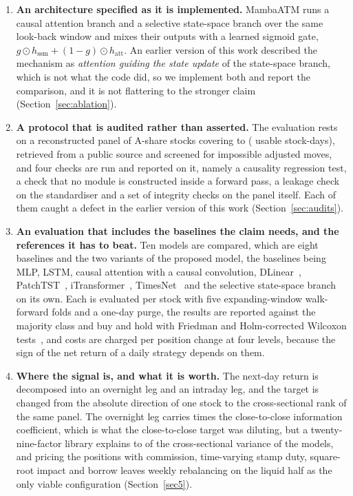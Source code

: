 \documentclass[pdflatex,sn-mathphys-ay]{sn-jnl}
\theoremstyle{thmstyleone}%
\theoremstyle{thmstyletwo}%
\theoremstyle{thmstyletwo}%
\begin{document}
\begin{enumerate}
	\item \textbf{An architecture specified as it is implemented.} MambaATM runs a causal attention
	branch and a selective state-space branch over the same look-back window and mixes their outputs
	with a learned sigmoid gate, $g \odot h_{\text{ssm}} + (1-g) \odot h_{\text{att}}$. An earlier
	version of this work described the mechanism as \emph{attention guiding the state update} of the
	state-space branch, which is not what the code did, so we implement both and report the
	comparison, and it is not flattering to the stronger claim (Section~\ref{sec:ablation}).
	
	\item \textbf{A protocol that is audited rather than asserted.} The evaluation rests on a
	reconstructed panel of \nStocks{} A-share stocks covering \firstDate{} to \lastDate{}
	(\nStockDays{} usable stock-days), retrieved from a public source and screened for impossible
	adjusted moves, and four checks are run and reported on it, namely a causality regression test, a
	check that no module is constructed inside a forward pass, a leakage check on the standardiser
	and a set of integrity checks on the panel itself. Each of them caught a defect in the earlier
	version of this work (Section~\ref{sec:audits}).
	
	\item \textbf{An evaluation that includes the baselines the claim needs, and the references it has
	to beat.} Ten models are compared, which are eight baselines and the two variants of the
	proposed model, the baselines being MLP, LSTM, causal attention with a causal convolution,
	DLinear~\citep{zeng2023dlinear}, PatchTST~\citep{nie2023patchtst},
	iTransformer~\citep{liu2024itransformer}, TimesNet~\citep{wu2023timesnet} and the selective
	state-space branch on its own. Each is evaluated per stock with five expanding-window
	walk-forward folds and a one-day purge, the results are reported against the majority class and
	buy and hold with Friedman and Holm-corrected Wilcoxon
	tests~\citep{friedman1937use,wilcoxon1945individual}, and costs are charged per position change at
	four levels, because the sign of the net return of a daily strategy depends on them.
	
	\item \textbf{Where the signal is, and what it is worth.} The next-day return is decomposed into
	an overnight leg and an intraday leg, and the target is changed from the absolute direction of
	one stock to the cross-sectional rank of the same panel. The overnight leg carries
	\dilutionRatio{} times the close-to-close information coefficient, which is what the
	close-to-close target was diluting, but a twenty-nine-factor library explains \rSquaredLo{} to
	\rSquaredHi{} of the cross-sectional variance of the models, and pricing the positions with
	commission, time-varying stamp duty, square-root impact and borrow leaves weekly rebalancing on
	the liquid half as the only viable configuration (Section~\ref{sec5}).
\end{enumerate}
\end{document}
